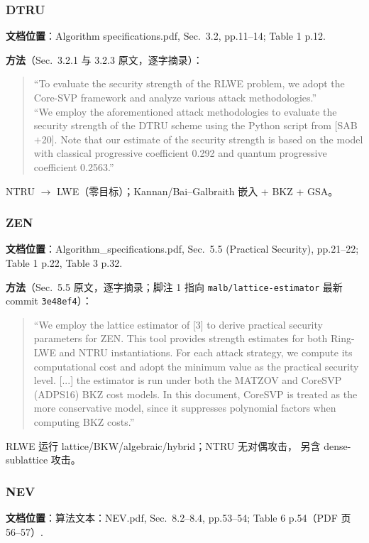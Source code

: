 \documentclass[11pt,a4paper]{ctexart}
\begin{document}
\subsubsection{DTRU}

\textbf{文档位置}：Algorithm specifications.pdf, Sec.~3.2, pp.11--14; Table 1 p.12.

\textbf{方法}（Sec.~3.2.1 与 3.2.3 原文，逐字摘录）：
\begin{quote}\small
``To evaluate the security strength of the RLWE problem, we adopt the Core-SVP framework and analyze various attack methodologies.''\\[0.3em]
``We employ the aforementioned attack methodologies to evaluate the security strength of the DTRU scheme using the Python script from [SAB$+$20]. Note that our estimate of the security strength is based on the model with classical progressive coefficient 0.292 and quantum progressive coefficient 0.2563.''
\end{quote}
NTRU $\to$ LWE（零目标）；Kannan/Bai--Galbraith 嵌入 + BKZ + GSA。

\subsubsection{ZEN}

\textbf{文档位置}：Algorithm\_specifications.pdf, Sec.~5.5 (Practical Security), pp.21--22; Table 1 p.22, Table 3 p.32.

\textbf{方法}（Sec.~5.5 原文，逐字摘录；脚注 1 指向
\texttt{malb/lattice-estimator} 最新 commit \texttt{3e48ef4}）：
\begin{quote}\small
``We employ the lattice estimator of [3] to derive practical security parameters for ZEN. This tool provides strength estimates for both Ring-LWE and NTRU instantiations. For each attack strategy, we compute its computational cost and adopt the minimum value as the practical security level. [...] the estimator is run under both the MATZOV and CoreSVP (ADPS16) BKZ cost models. In this document, CoreSVP is treated as the more conservative model, since it suppresses polynomial factors when computing BKZ costs.''
\end{quote}
RLWE 运行 lattice/BKW/algebraic/hybrid；NTRU 无对偶攻击，
另含 dense-sublattice 攻击。

\subsubsection{NEV}

\textbf{文档位置}：算法文本：NEV.pdf, Sec.~8.2--8.4, pp.53--54; Table 6 p.54（PDF 页 56--57）.
\end{document}
